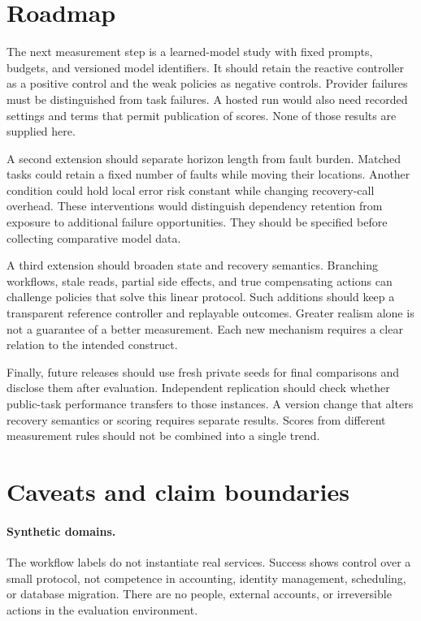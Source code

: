 \documentclass{article}
\begin{document}
\section{Roadmap}
The next measurement step is a learned-model study with fixed prompts, budgets, and versioned model identifiers. It should retain the reactive controller as a positive control and the weak policies as negative controls. Provider failures must be distinguished from task failures. A hosted run would also need recorded settings and terms that permit publication of scores. None of those results are supplied here.\par
A second extension should separate horizon length from fault burden. Matched tasks could retain a fixed number of faults while moving their locations. Another condition could hold local error risk constant while changing recovery-call overhead. These interventions would distinguish dependency retention from exposure to additional failure opportunities. They should be specified before collecting comparative model data.\par
A third extension should broaden state and recovery semantics. Branching workflows, stale reads, partial side effects, and true compensating actions can challenge policies that solve this linear protocol. Such additions should keep a transparent reference controller and replayable outcomes. Greater realism alone is not a guarantee of a better measurement. Each new mechanism requires a clear relation to the intended construct.\par
Finally, future releases should use fresh private seeds for final comparisons and disclose them after evaluation. Independent replication should check whether public-task performance transfers to those instances. A version change that alters recovery semantics or scoring requires separate results. Scores from different measurement rules should not be combined into a single trend.\par
\section{Caveats and claim boundaries}
\paragraph{Synthetic domains.} The workflow labels do not instantiate real services. Success shows control over a small protocol, not competence in accounting, identity management, scheduling, or database migration. There are no people, external accounts, or irreversible actions in the evaluation environment.
\end{document}
